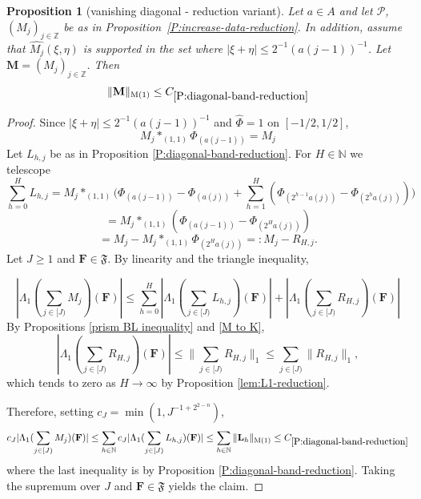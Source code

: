 \documentclass[12pt,reqno]{amsart}
\theoremstyle{plain}
\newtheorem{proposition}[theorem]{Proposition}
\numberwithin{equation}{section}
\theoremstyle{remark}
\newcommand{\uses}[1]{}
\newcommand{\usesdefs}[1]{}
\newcommand{\Z}{{\mathbb Z}}
\newcommand{\N}{{\mathbb N}}
\newcommand{\F}{\mathbf{F}}
\begin{document}
\begin{proposition}[vanishing diagonal - reduction variant]
\label{P:vanishing-diagonal-reduction}\uses{P:diagonal-band-reduction,prism BL inequality,M to K,lem:L1-reduction,P:increase-data-reduction}\usesdefs{auto:Wiener-space-definition,auto:convolution-along-vector-definition,normalized function tuples,auto:prism-form-definition,multiplicatively spaced monotone sequences,standard bump,kernel sequences}
Let $a\in A$ and let $\mathcal P$, $(M_j)_{j\in \Z}$ be as in Proposition~\ref{P:increase-data-reduction}. In addition, assume that $\widehat{M_j}(\xi,\eta)$ is supported in the set where $|\xi+\eta| \leq 2^{-1} (a(j-1))^{-1}$.
Let $\mathbf{M}=(M_j)_{j\in \Z}$. Then
\begin{equation}\label{auto:vanishing-diagonal-M-bound}
\|\mathbf{M}\|_{\rm M(1)} \leq C_{\ref{P:diagonal-band-reduction}}
\end{equation}
\end{proposition}

\begin{proof}Since    $|\xi+\eta|\le 2^{-1} (a(j-1))^{-1}$ and   $\widehat{\Phi}=1$ on $[-1/2,1/2]$,
\[M_j*_{(1,1)}\Phi_{(a(j-1))}=M_j\]
Let $L_{h,j}$ be as in Proposition \ref{P:diagonal-band-reduction}. For $H\in \N$ we telescope
\[\sum_{h=0}^H L_{h,j} = M_j*_{(1,1)} \Big( \Phi_{(a(j-1))}-\Phi_{(a(j))} + \sum_{h=1}^{H}
( \Phi_{(2^{h-1}a(j))} - \Phi_{(2^ha(j))} ) \Big)\]
\[= M_j*_{(1,1)} ( \Phi_{(a(j-1))} - \Phi_{(2^Ha(j))} )\]
\[= M_j-M_j*_{(1,1)}\Phi_{(2^Ha(j))} =: M_j-R_{H,j}.\]
Let $J\ge 1$ and $\F\in \mathfrak{F}$. By linearity and the triangle inequality,

\[|\Lambda_1 (\sum_{j\in [J)} M_j )(\F)| \le  \sum_{h=0}^H |\Lambda_1( \sum_{j\in [J)}L_{h,j})(\F)| + |\Lambda_1( \sum_{j\in [J)}R_{H,j})(\F)| \]
By Propositions  \ref{prism BL inequality} and \ref{M to K},
\[|\Lambda_1( \sum_{j\in [J)}R_{H,j})(\F)| \le \|\sum_{j\in [J)}R_{H,j}\|_1 \le \sum_{j\in [J)}\|R_{H,j}\|_1,\]
which tends to zero as $H\to \infty$ by Proposition \ref{lem:L1-reduction}.

Therefore, setting $c_J = \min(1,J^{-1+2^{2-n}})$,
\[c_J |\Lambda_1 (\sum_{j\in [J)} M_j )(\F)| \le  \sum_{h\in\N} c_J |\Lambda_1( \sum_{j\in [J)}L_{h,j})(\F)|\le \sum_{h\in \N} \|\mathbf{L}_h\|_{\rm M(1)} \le C_{\ref{P:diagonal-band-reduction}}\]
where the last inequality is by Proposition
\ref{P:diagonal-band-reduction}. Taking the supremum over
$J$ and $\mathbf F\in\mathfrak F$ yields the claim.
\end{proof}
\end{document}
